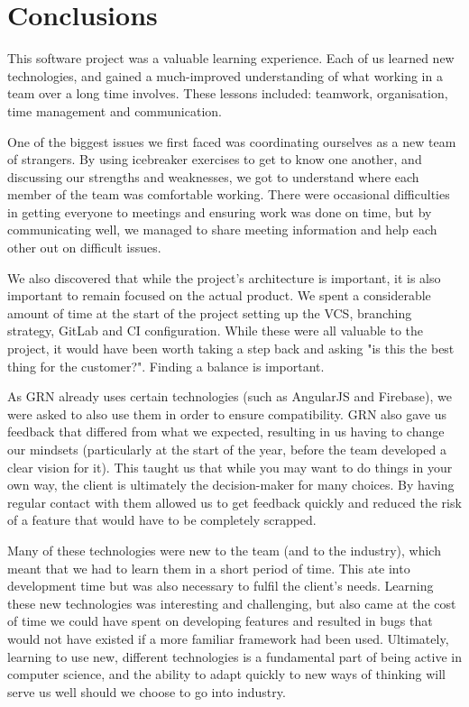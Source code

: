 \documentclass{l3proj}
\begin{document}
\section{Conclusions} %
\label{sec:conclusion}


This software project was a valuable learning experience. Each of
 us learned new technologies, and gained a much-improved understanding
 of what working in a team over a long time involves. These lessons
 included: teamwork, organisation, time management and communication.

One of the biggest issues we first faced was coordinating ourselves as a
 new team of strangers. By using icebreaker exercises to get to know
 one another, and discussing our strengths and weaknesses, we got to
 understand where each member of the team was comfortable working. There
 were occasional difficulties in getting everyone to meetings and ensuring
 work was done on time, but by communicating well, we managed to share
 meeting information and help each other out on difficult issues.

We also discovered that while the project's architecture is important,
 it is also important to remain focused on the actual product. We
 spent a considerable amount of time at the start of the project setting
 up the VCS, branching strategy, GitLab and CI configuration. While these
 were all valuable to the project, it would have been worth taking a step
 back and asking "is this the best thing for the customer?". Finding a balance
 is important.

As GRN already uses certain technologies (such as AngularJS and Firebase),
 we were asked to also use them in order to ensure compatibility. GRN also
 gave us feedback that differed from what we expected, resulting in us
 having to change our mindsets (particularly at the start of the year,
 before the team developed a clear vision for it). This taught us that
 while you may want to do things in your own way, the client is ultimately
 the decision-maker for many choices. By having regular contact with them
 allowed us to get feedback quickly and reduced the risk of a feature that
 would have to be completely scrapped.

Many of these technologies were new to the team (and to the industry),
 which meant that we had to learn them in a short period of time. This
 ate into development time but was also necessary to fulfil the client's
 needs. Learning these new technologies was interesting and challenging,
 but also came at the cost of time we could have spent on developing
 features and resulted in bugs that would not have existed if a more
 familiar framework had been used. Ultimately, learning to use new, different
 technologies is a fundamental part of being active in computer science,
 and the ability to adapt quickly to new ways of thinking will serve us well
 should we choose to go into industry.
\end{document}
